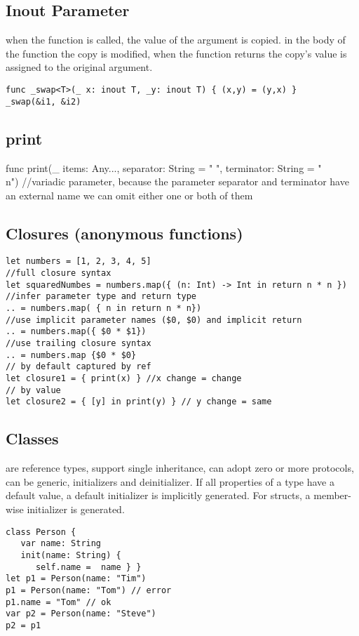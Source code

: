 \subsection{Inout Parameter}
when the function is called, the value of the argument is copied. in the body of the function the copy is modified, when the function returns the copy's value is assigned to the original argument.
\begin{lstlisting}
func _swap<T>(_ x: inout T, _y: inout T) { (x,y) = (y,x) }
_swap(&i1, &i2)
\end{lstlisting}

\subsection{print}
func print(\_ items: Any..., separator: String = " ", terminator: String = "\\n")
//variadic parameter, because the parameter separator and terminator have an external name we can omit either one or both of them

\subsection{Closures (anonymous functions)}
\begin{lstlisting}
let numbers = [1, 2, 3, 4, 5]
//full closure syntax
let squaredNumbes = numbers.map({ (n: Int) -> Int in return n * n })
//infer parameter type and return type
.. = numbers.map( { n in return n * n})
//use implicit parameter names ($0, $0) and implicit return
.. = numbers.map({ $0 * $1})
//use trailing closure syntax
.. = numbers.map {$0 * $0}
// by default captured by ref
let closure1 = { print(x) } //x change = change
// by value
let closure2 = { [y] in print(y) } // y change = same
\end{lstlisting}

\subsection{Classes}
are reference types, support single inheritance, can adopt zero or more protocols, can be generic, initializers and deinitializer. If all properties of a type have a default value, a default initializer is implicitly generated. For structs, a member-wise initializer is generated.
\begin{lstlisting}
class Person {
   var name: String
   init(name: String) {
      self.name =  name } }
let p1 = Person(name: "Tim")
p1 = Person(name: "Tom") // error
p1.name = "Tom" // ok
var p2 = Person(name: "Steve")
p2 = p1
\end{lstlisting}

